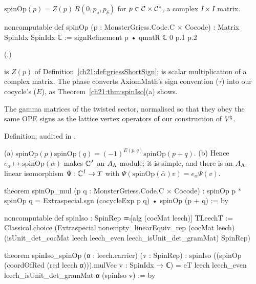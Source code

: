 \begin{definition}\label{ch21:def:spinOp}
$\mathrm{spinOp}(p)=Z(p)\,R(0,p_a,p_\delta)$ for $p\in\mathcal{C}\times\mathcal{C}^*$, a complex $I\times I$ matrix.
\end{definition}
\begin{leancode}
noncomputable def spinOp (p : MonsterGriess.Code.C × Cocode) : Matrix SpinIdx SpinIdx ℂ :=
  signRefinement p • qmatR ℂ 0 p.1 p.2
\end{leancode}
(.)
\begin{dictionary}
 is $Z(p)$ of Definition~\ref{ch21:def:griessShortSign};  is scalar
multiplication of a complex matrix.  The phase converts AxiomMath's sign convention
($\tau$) into our cocycle's ($E$), as Theorem~\ref{ch21:thm:spinIso}(a) shows.
\end{dictionary}
\begin{physics}
The gamma matrices of the twisted sector, normalised so that they obey the same OPE signs as the
lattice vertex operators of our construction of ${V^{\natural}}$.
\end{physics}
\begin{status}
Definition; audited in .
\end{status}
\begin{theorem}[$\C^I$ is $T$]\label{ch21:thm:spinIso}
(a) $\mathrm{spinOp}(p)\mathrm{spinOp}(q)=(-1)^{E(p,q)}\mathrm{spinOp}(p+q)$.  (b) Hence
$e_\alpha\mapsto\mathrm{spinOp}(\bar\alpha)$ makes $\C^I$ an $A_{\Lambda}$-module; it is simple, and there is an
$A_{\Lambda}$-linear isomorphism $\Psi:{\mathbb{C}}^I\to T$ with $\Psi(\mathrm{spinOp}(\bar\alpha)v)=e_\alpha\Psi(v)$.
\end{theorem}
\begin{leancode}
theorem spinOp_mul (p q : MonsterGriess.Code.C × Cocode) :
    spinOp p * spinOp q = Extraspecial.sgn (cocycleExp p q) • spinOp (p + q) := by
\end{leancode}
\begin{leancode}
noncomputable def spinIso : SpinRep ≃ₗ[alg (cocMat leech)] TLeechT :=
  Classical.choice (Extraspecial.nonempty_linearEquiv_rep (cocMat leech)
    (isUnit_det_cocMat leech leech_even leech_isUnit_det_gramMat) SpinRep)
\end{leancode}
\begin{leancode}
theorem spinIso_spinOp (α : leech.carrier) (v : SpinRep) :
    spinIso ((spinOp (coordOfRed (red leech α))).mulVec v : SpinIdx → ℂ)
      = eT leech leech_even leech_isUnit_det_gramMat α (spinIso v) := by
\end{leancode}
